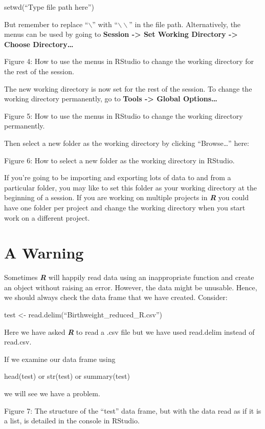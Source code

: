 \documentclass[
]{book}
\begin{document}
setwd(``Type file path here'')

But remember to replace ``\(\backslash\)'' with ``\(\backslash \backslash\)'' in the file path. Alternatively, the menus can be used by going to \textbf{Session -\textgreater{} Set Working Directory -\textgreater{} Choose Directory\ldots{}}

Figure 4: How to use the menus in RStudio to change the working directory for the rest of the session.

The new working directory is now set for the rest of the session. To change the working directory permanently, go to \textbf{Tools -\textgreater{} Global Options\ldots{}}

Figure 5: How to use the menus in RStudio to change the working directory permanently.

Then select a new folder as the working directory by clicking ``Browse\ldots{}'' here:

Figure 6: How to select a new folder as the working directory in RStudio.

If you're going to be importing and exporting lots of data to and from a particular folder, you may like to set this folder as your working directory at the beginning of a session. If you are working on multiple projects in \textbf{\emph{R}} you could have one folder per project and change the working directory when you start work on a different project.

\section{A Warning}\label{a-warning}

Sometimes \textbf{\emph{R}} will happily read data using an inappropriate function and create an object without raising an error. However, the data might be unusable. Hence, we should always check the data frame that we have created. Consider:

test \textless- read.delim(``Birthweight\_reduced\_R.csv'')

Here we have asked \textbf{\emph{R}} to read a .csv file but we have used read.delim instead of read.csv.

If we examine our data frame using

head(test)
or
str(test)
or
summary(test)

we will see we have a problem.

Figure 7: The structure of the ``test'' data frame, but with the data read as if it is a list, is detailed in the console in RStudio.
\end{document}

